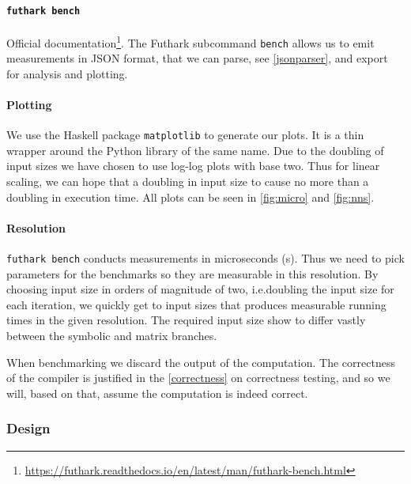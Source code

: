 \paragraph{\texttt{futhark bench}}
Official documentation\footnote{\url{https://futhark.readthedocs.io/en/latest/man/futhark-bench.html}}.
The Futhark subcommand \texttt{bench} allows us to emit measurements in JSON
format, that we can parse, see \autoref{jsonparser}, and export for analysis and
plotting.

\paragraph{Plotting}\label{plots} We use the Haskell package \texttt{matplotlib}
to generate our plots.  It is a thin wrapper around the Python library of the
same name.  Due to the doubling of input sizes we have chosen to use log-log
plots with base two. Thus for linear scaling, we can hope that a doubling in
input size to cause no more than a doubling in execution time.  All plots can
be seen in \autoref{fig:micro} and \autoref{fig:nns}.

%


\paragraph{Resolution} \texttt{futhark bench} conducts measurements in
microseconds (\mu{}s).  Thus we need to pick parameters for the benchmarks so
they are measurable in this resolution.
By choosing input size in orders of magnitude of two, i.e.\@ doubling the input
size for each iteration, we quickly get to input sizes that produces measurable
running times in the given resolution.  The required input size show to differ
vastly between the symbolic and matrix branches.

When benchmarking we discard the output of the computation.  The correctness
of the compiler is justified in the \autoref{correctness} on correctness
testing, and so we will, based on that, assume the computation is indeed correct.

\subsubsection{Design}


